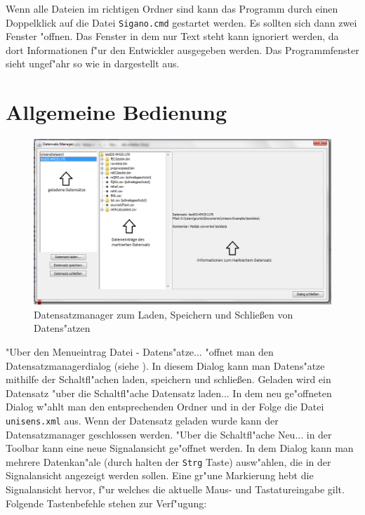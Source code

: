 Wenn alle Dateien im richtigen Ordner sind kann das Programm durch einen Doppelklick auf die Datei \verb|Sigano.cmd| gestartet werden.
Es sollten sich dann zwei Fenster "offnen.
Das Fenster in dem nur Text steht kann ignoriert werden, da dort Informationen f"ur den Entwickler ausgegeben werden.
Das Programmfenster sieht ungef"ahr so wie in  dargestellt aus.

\section{Allgemeine Bedienung}

\begin{figure}[htb]
\centering
\includegraphics[width=\textwidth]{bilder/datensatzmanager.png}
\caption{Datensatzmanager zum Laden, Speichern und Schlie{\ss}en von Datens"atzen}
\label{pic:datensatzmanager}
\end{figure}

"Uber den Menueintrag \textsf{Datei - Datens"atze...} "offnet man den Datensatzmanagerdialog (siehe ).
In diesem Dialog kann man Datens"atze mithilfe der Schaltfl"achen laden, speichern und schlie{\ss}en.
Geladen wird ein Datensatz "uber die Schaltfl"ache \textsf{Datensatz laden...}
In dem neu ge"offneten Dialog w"ahlt man den entsprechenden Ordner und in der Folge die Datei \verb|unisens.xml| aus.
Wenn der Datensatz geladen wurde kann der Datensatzmanager geschlossen werden.
"Uber die Schaltfl"ache \textsf{Neu...} in der Toolbar kann eine neue Signalansicht ge"offnet werden.
In dem Dialog kann man mehrere Datenkan"ale (durch halten der \verb|Strg| Taste) ausw"ahlen, die in der Signalansicht angezeigt werden sollen.
Eine gr"une Markierung hebt die Signalansicht hervor, f"ur welches die aktuelle Maus- und Tastatureingabe gilt.
Folgende Tastenbefehle stehen zur Verf"ugung:

